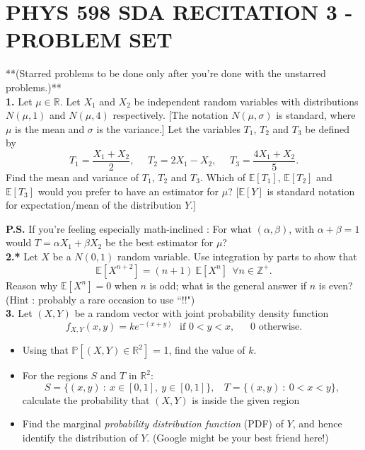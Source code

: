 \documentclass[aps,prl,groupedaddress,amsmath,amssymb,nofootinbib,12pt]{revtex4-1}
\begin{document}
\section{PHYS 598 SDA RECITATION 3 - PROBLEM SET}

**(Starred problems to be done only after you're done with the unstarred problems.)**\\

\textbf{1.} Let $\mu \in \mathbb{R}$. Let $X_1$ and $X_2$ be independent random variables with distributions $N(\mu,1)$ and $N(\mu,4)$ respectively. [The notation $N(\mu,\sigma)$ is standard, where $\mu$ is the mean and $\sigma$ is the variance.] Let the variables $T_1$, $T_2$ and $T_3$ be defined by
\begin{equation}
T_1 = \frac{X_1 +X_2}{2}, ~~~~~~ T_2 = 2X_1 - X_2, ~~~~~~ T_3 = \frac{4X_1 + X_2}{5}.
\end{equation}
Find the mean and variance of $T_1$, $T_2$ and $T_3$. Which of $\mathbb{E}[T_1]$, $\mathbb{E}[T_2]$ and $\mathbb{E}[T_3]$ would you prefer to have an estimator for $\mu$? [$\mathbb{E}[Y]$ is standard notation for expectation/mean of the distribution $Y$.] 
\vspace{1 mm}


\textbf{P.S. } If you're feeling especially math-inclined : For what $(\alpha,\beta)$, with $\alpha+\beta = 1$ would $T = \alpha X_1+\beta X_2$ be the best estimator for $\mu$? \\

\textbf{2.*} Let $X$ be a $N(0, 1)$ random variable. Use integration by parts to show that 
\begin{equation}
\mathbb{E}[X^{n+2}] = (n+1)~\mathbb{E}[X^{n}] ~~ \forall n \in \mathbb{Z}^+.
\end{equation}
Reason why $\mathbb{E}[X^{n}] = 0$ when $n$ is odd; what is the general answer if $n$ is even? (Hint : probably a rare occasion to use ``!!")\\

\textbf{3.} Let $(X, Y)$ be a random vector with joint probability density function
\begin{equation}
f_{X,Y}(x,y) = ke^{-(x+y)}~~~ \text{if }0<y<x , ~~~~~~~ 0 \text{ otherwise.}
\end{equation}
\begin{itemize}
\item
Using that $\mathbb{P}[(X, Y ) \in \mathbb{R}^2]$ = 1, find the value of $k$.
\vspace{-2 mm}

\item
For the regions $S$ and $T$ in $\mathbb{R}^2$:
\[ S = \{(x,y)~ :~ x \in [0,1], ~y \in [0,1]\}, ~~~~T = \{(x,y)~ :~ 0<x<y\},\]
calculate the probability that $(X, Y)$ is inside the given region
\vspace{-2 mm}

\item
Find the marginal \emph{probability distribution function} (PDF) of $Y$, and hence identify the distribution of $Y$. (Google might be your best friend here!)
\end{itemize}
\end{document}
